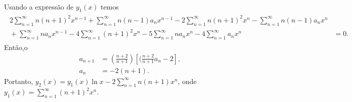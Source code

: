 \documentclass[a4paper,12pt, leqno, answers]{exam}
\begin{document}
\begin{questions}
\begin{solution}
\begin{align*}
\begin{split}
            \end{split}
        \end{align*}
        Usando a express\~{a}o de $y_1(x)$ temos 
        \begin{align*}
            \begin{split}
                2 \sum_{n = 1}^\infty n (n + 1)^2 x^{n - 1} + \sum_{n = 1}^\infty n (n - 1) a_n x^{n - 1} - 2 \sum_{n = 1}^\infty n (n + 1)^2 x^n - \sum_{n = 1}^\infty n (n - 1) a_n x^n & \\
                {}+ \sum_{n = 1}^\infty n a_n x^{n - 1} - 4 \sum_{n = 1}^\infty (n + 1)^2 x^n - 5 \sum_{n = 1}^\infty n a_n x^n - 4 \sum_{n = 1}^\infty a_n x^n &= 0.
            \end{split}
        \end{align*}
        Ent\~{a}o,o\begin{align*}
            a_{n + 1} &= \left( \frac{n + 2}{n + 1} \right) \left[ (\frac{n + 2}{n + 1} a_n - 2 \right], \\
            a_n &= -2 (n + 1).
        \end{align*}
        Portanto, $y_2(x) = y_1(x) \ln x - 2 \sum_{n = 1}^\infty n (n + 1) x^n$, onde $y_1(x) = \sum_{n = 1}^\infty (n + 1)^2 x^n$.
    \end{solution}
\end{questions}


\end{document}
